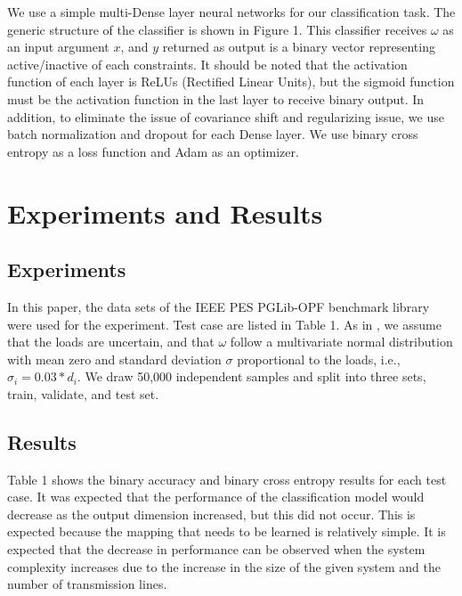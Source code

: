 \documentclass[11pt]{article}
\begin{document}
We use a simple multi-Dense layer neural networks for our classification task. The generic structure of the classifier is shown in Figure 1. This classifier receives $\omega$ as an input argument $x$, and $y$ returned as output is a binary vector representing active/inactive of each constraints. It should be noted that the activation function of each layer is ReLUs (Rectified Linear Units), but the sigmoid function must be the activation function in the last layer to receive binary output. In addition, to eliminate the issue of covariance shift and regularizing issue, we use batch normalization\cite{batch_norm} and dropout\cite{dropout} for each Dense layer. We use binary cross entropy\cite{bin_cross_entropy} as a loss function and Adam\cite{adam} as an optimizer.


\section{Experiments and Results}\label{sec:experiment_result}
\subsection{Experiments}
In this paper, the data sets of the IEEE PES PGLib-OPF benchmark library \cite{pglib-opf} were used for the experiment. Test case are listed in Table 1. As in \cite{learning_dc_opf}, we assume that the loads are uncertain, and that $\omega$ follow a multivariate normal distribution with mean zero and standard deviation $\sigma$ proportional to the loads, i.e., $\sigma_{i} = 0.03*d_{i}$. We draw 50,000 independent samples and split into three sets, train, validate, and test set.  

\subsection{Results}
Table 1 shows the binary accuracy and binary cross entropy results for each test case. It was expected that the performance of the classification model would decrease as the output dimension increased, but this did not occur. This is expected because the mapping that needs to be learned is relatively simple. It is expected that the decrease in performance can be observed when the system complexity increases due to the increase in the size of the given system and the number of transmission lines. 
\end{document}
